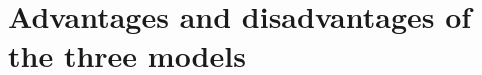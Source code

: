 \documentclass[Main_Assignment2]{subfiles}
\begin{document}
\section{Advantages and disadvantages of the three models}
\end{document}
